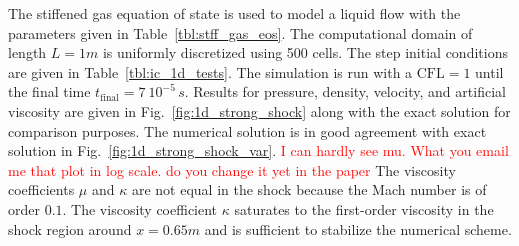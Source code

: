 \documentclass[review,10pt]{elsarticle}
\newcommand{\fig}[1]{Fig.~\ref{#1}}                      %
\newcommand{\tbl}[1]{Table~\ref{#1}}                     %
\newcommand{\tcr}[1]{\textcolor{red}{#1}}
\begin{document}
The stiffened gas equation of state is used to model a liquid flow with the parameters given in 
\tbl{tbl:stff_gas_eos}. The computational domain of length $L=1m$ is uniformly discretized using 500 cells. 
The step initial conditions are given in \tbl{tbl:ic_1d_tests}.
%
The simulation is run with a $\text{CFL}=1$ until the final time $t_{\text{final}} = 7 \ 10^{-5}\,s$. Results 
for pressure, density, velocity, and artificial viscosity are given in \fig{fig:1d_strong_shock} 
along with the exact solution for comparison purposes. The numerical solution is in good agreement 
with exact solution in \fig{fig:1d_strong_shock_var}. 
\tcr{I can hardly see mu. What you email me that plot in log scale. do you change it yet in the paper}
The viscosity coefficients $\mu$ and $\kappa$ 
are not equal in the shock because the Mach number is of order $0.1$. The viscosity coefficient $\kappa$ 
saturates to the first-order viscosity in the shock region around $x = 0.65m$ and is sufficient to 
stabilize the numerical scheme. 
%
\end{document}
